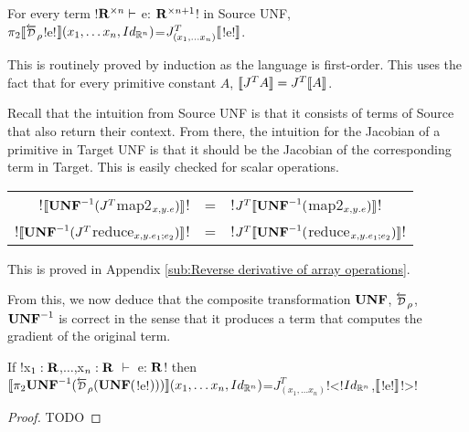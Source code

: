 \begin{proposition}
    For every term !$\mathbf{R}^{\times n} \vdash$ e: $\mathbf{R}^{\times n+1}$! in Source UNF,\\ 
    $\pi_2 \seml \Dsynrevsymbol_{\rho}$!e!$\rrbracket(x_1,\ldots x_n,Id_{\mathbb{R}^n})$=$J^T_{(x_1,\ldots x_n)}\llbracket$!e!$\rrbracket$.
\end{proposition}

This is routinely proved by induction as the language is first-order. 
This uses the fact that for every primitive constant $A$, $\llbracket J^TA\rrbracket=J^T\llbracket A\rrbracket$.

Recall that the intuition from Source UNF is that it consists of terms of Source that also return their context.
From there, the intuition for the Jacobian of a primitive in Target UNF is that it should be the Jacobian of
the corresponding term in Target. This is easily checked for scalar operations.  

\begin{proposition}
    \begin{center}
\begin{tabular}{r c l}
    !$\llbracket\mathbf{UNF}^{-1}(J^T$map2$_{x,y.e})\rrbracket$! &=& !$J^T\llbracket\mathbf{UNF}^{-1}($map2$_{x,y.e})\rrbracket$!\\
    !$\llbracket\mathbf{UNF}^{-1}(J^T$reduce$_{x,y.e_1;e_2})\rrbracket$! &=& !$J^T\llbracket\mathbf{UNF}^{-1}($reduce$_{x,y.e_1;e_2})\rrbracket$!
\end{tabular}
\end{center}
\end{proposition}

This is proved in Appendix \ref{sub:Reverse derivative of array operations}.

From this, we now deduce that the composite transformation $\mathbf{UNF}$, $\Dsynrevsymbol_{\rho}$, $\mathbf{UNF}^{-1}$ is correct
in the sense that it produces a term that computes the gradient of the original term.

\begin{proposition}
    If !x$_1:\mathbf{R}$,$\ldots$,x$_n:\mathbf{R}$ $\vdash$ e: $\mathbf{R}$! then \\
    $\seml \pi_2 \UNFSymbol^{-1}(\Dsynrevsymbol_{\rho}(\UNFSymbol($!e!$)))\rrbracket(x_1,\ldots x_n,Id_{\mathbb{R}^n})$=$J^T_{(x_1,\ldots x_n)}$!<!$Id_{\mathbb{R}^n}$,$\llbracket$!e!$\rrbracket$!>!
\end{proposition}

\begin{proof}
    TODO
\end{proof}

